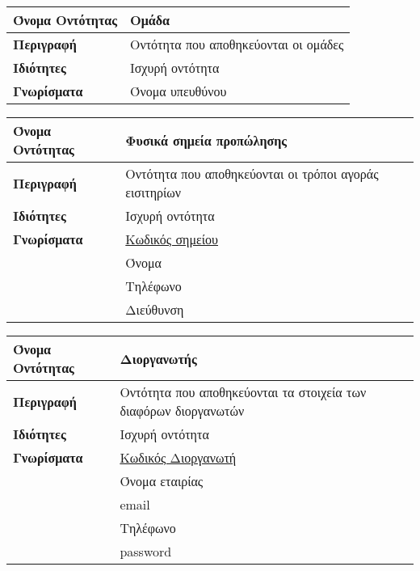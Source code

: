 \begin{center}
\begin{tabular}[]{|p{4cm}|p{10cm}|}
\hline
\textbf{Όνομα Οντότητας} & Ομάδα                                \\ \hline 
\textbf{Περιγραφή}       & Οντότητα που αποθηκεύονται οι ομάδες \\ \hline 
\textbf{Ιδιότητες}       & Ισχυρή  οντότητα                      \\ \hline
\textbf{Γνωρίσματα}      & Όνομα υπευθύνου                      \\ \hline 
\end{tabular}
\vspace{0.3 cm}

\begin{tabular}[]{|p{4cm}|p{10cm}|}
 \hline
\textbf{Όνομα Οντότητας}   &  Φυσικά σημεία προπώλησης \\ \hline 
\textbf{Περιγραφή}         &  Οντότητα που αποθηκεύονται οι τρόποι αγοράς εισιτηρίων \\\hline 
\textbf{Ιδιότητες}         &  Ισχυρή οντότητα \\       \hline           
\textbf{Γνωρίσματα}        &  \underline{Κωδικός σημείου} \\
                           &  Όνομα \\
                           &  Τηλέφωνο \\
                           &  Διεύθυνση \\ 
\hline 
\end{tabular}
\vspace{0.3 cm}

\begin{tabular}[]{|p{4cm}|p{10cm}|}
\hline
\textbf{Όνομα Οντότητας}   &  Διοργανωτής \\ \hline 
\textbf{Περιγραφή}         &  Οντότητα που αποθηκεύονται τα στοιχεία
                             των διαφόρων διοργανωτών \\ \hline 
\textbf{Ιδιότητες}         &  Ισχυρή οντότητα \\  \hline                 
\textbf{Γνωρίσματα}        &  \underline{Κωδικός Διοργανωτή} \\
            ~              &  Όνομα εταιρίας \\
             ~             &  email \\
                           &  Τηλέφωνο \\
                           &  password \\
\hline
\end{tabular}
\vspace{0.3 cm}


\end{center}
